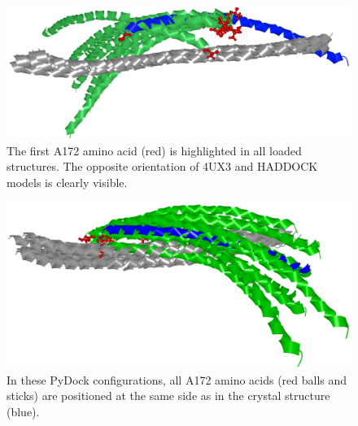 \documentclass[twocolumn]{bmcart}%
\begin{document}
\begin{figure}[b]
  \centering
  \vspace{5pt}
  \includegraphics[width=0.95\columnwidth]{images/figure11.png}
 \caption{ The first A172 amino acid (red) is highlighted in all loaded structures. The opposite orientation of 4UX3 and HADDOCK models is clearly visible.}
  \label{fig:coiled_haddock}
\end{figure}

\begin{figure}[tb]
  \centering
  \includegraphics[width=0.9\columnwidth]{images/figure12.png}
  \caption{ In these PyDock configurations, all A172 amino acids (red balls and sticks) are positioned at the same side as in the crystal structure (blue).}
  \label{fig:selection2SMC3PyDock}
\end{figure}
\end{document}
